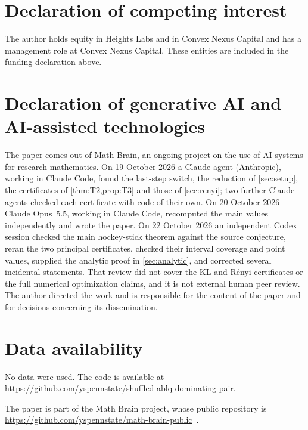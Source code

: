 \documentclass[11pt]{amsart}
\theoremstyle{definition}
\theoremstyle{remark}
\begin{document}
\section*{Declaration of competing interest}
The author holds equity in Heights Labs and in Convex Nexus Capital and
has a management role at Convex Nexus Capital. These entities are included
in the funding declaration above.

\section*{Declaration of generative AI and AI-assisted technologies}
The paper comes out of Math Brain, an ongoing project on the use of AI systems for research mathematics. On 19 October 2026 a Claude agent (Anthropic), working in Claude Code, found the last-step switch, the reduction of \cref{sec:setup}, the certificates of \cref{thm:T2,prop:T3} and those of \cref{sec:renyi}; two further Claude agents checked each certificate with code of their own. On 20 October 2026 Claude Opus~5.5, working in Claude Code, recomputed the main values independently and wrote the paper. On 22 October 2026 an independent Codex session checked the main hockey-stick theorem against the source conjecture, reran the two principal certificates, checked their interval coverage and point values, supplied the analytic proof in \cref{sec:analytic}, and corrected several incidental statements. That review did not cover the KL and R\'enyi certificates or the full numerical optimization claims, and it is not external human peer review. The author directed the work and is responsible for the content of the paper and for decisions concerning its dissemination.

\section*{Data availability}
No data were used. The code is available at\\ \url{https://github.com/yspennstate/shuffled-ablq-dominating-pair}.

The paper is part of the Math Brain project, whose public repository is \url{https://github.com/yspennstate/math-brain-public}~\cite{MathBrainRepo}.
\end{document}
